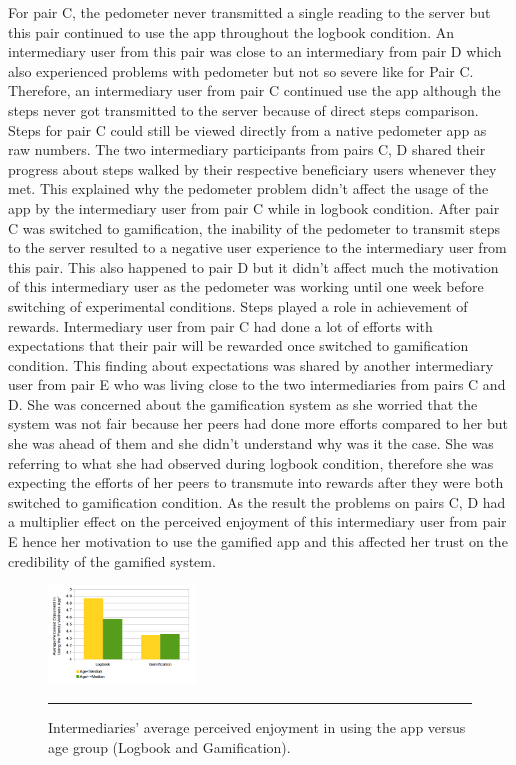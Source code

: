 \documentclass{sig-alternate}
\begin{document}
For pair C, the pedometer never transmitted a single reading to the server but this pair continued to use the app throughout the logbook condition. An intermediary user from this pair was close to an intermediary from pair D which also experienced problems with pedometer but not so severe like for Pair C. Therefore, an intermediary user from pair C continued use the app although the steps never got transmitted to the server because of direct steps comparison. Steps for pair C could still be viewed directly from a native pedometer app as raw numbers. The two intermediary participants from pairs C, D shared their progress about steps walked by their respective beneficiary users whenever they met. This explained why the pedometer problem didn't affect the usage of the app by the intermediary user from pair C while in logbook condition. After pair C was switched to gamification, the inability of the pedometer to transmit steps to the server resulted to a negative user experience to the intermediary user from this pair. This also happened to pair D but it didn't affect much the motivation of this intermediary user as the pedometer was working until one week before switching of experimental conditions. Steps played a role in achievement of rewards. Intermediary user from pair C had done a lot of efforts with expectations that their pair will be rewarded once switched to gamification condition. This finding about expectations was shared by another intermediary user from pair E who was living close  to the two intermediaries from pairs C and D. She was concerned about the gamification system as she worried that the system was not fair because her peers had done more efforts compared to her but she was ahead of them and she didn't understand why was it the case. She was referring to what she had observed during logbook condition,  therefore she was expecting the efforts of her peers to transmute into rewards after they were both switched to gamification condition. As the result the problems on pairs C, D had a multiplier  effect on the perceived enjoyment of this intermediary user from pair E hence her motivation to use the gamified app and this affected her trust on the credibility of the gamified system.\newline 
\begin{figure}[htbp]
  \centering
    \includegraphics[width=0.35\textwidth]{PE_Interm_App_exp_seq.png}
    \rule{26em}{0.5pt}
  \caption{Intermediaries' average perceived enjoyment in using the app versus age group (Logbook and Gamification).}
  \label{figure:PE_Interm_App_exp_seq}
\end{figure}\newline
\end{document}
